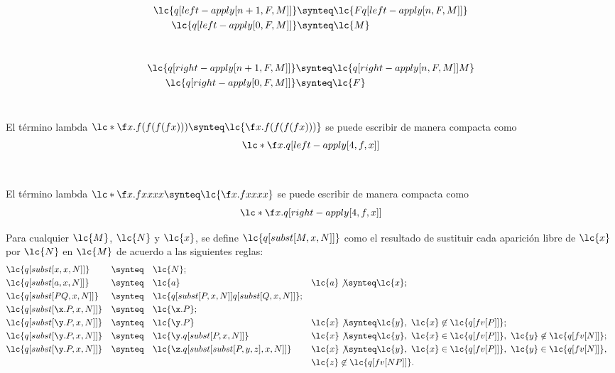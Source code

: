 \begin{align*}
  \lc{q[left-apply[n+1,F,M]]} &\synteq \lc{F q[left-apply[n,F,M]]}\\
  \lc{q[left-apply[0,F,M]]}   &\synteq \lc{M}
\end{align*} \

\begin{align*}
  \lc{q[right-apply[n+1,F,M]]} &\synteq \lc{q[right-apply[n,F,M]] M}\\
  \lc{q[right-apply[0,F,M]]}   &\synteq \lc{F}
\end{align*} \

\begin{ejemplo} El término lambda \(\lc*{\f x.f(f(f(f x)))} \synteq \lc{\f
    x.f(f(f(f x)))}\) se puede escribir de manera compacta como
  \[\lc*{\f x.q[left-apply[4,f,x]]}\]
\end{ejemplo} \

\begin{ejemplo} El término lambda \(\lc*{\f x.f x x x x} \synteq \lc{\f x.f x x
    x x}\) se puede escribir de manera compacta como
  \[\lc*{\f x.q[right-apply[4,f,x]]}\]
\end{ejemplo}

\begin{defi}[Sustitución] Para cualquier \(\lc{M}\), \(\lc{N}\) y \(\lc{x}\), se define \(\lc{q[subst[M,x,N]]}\) como el resultado de sustituir cada aparición libre de \(\lc{x}\) por \(\lc{N}\) en \(\lc{M}\) de acuerdo a las siguientes reglas:
  \label{definicion:sustitucion}
  \begin{align*}
    &\lc{q[subst[x,x,N]]} & &\synteq & &\lc{N}; \\
    &\lc{q[subst[a,x,N]]} & &\synteq & &\lc{a} & &\lc{a} \not\synteq \lc{x}; \\
    &\lc{q[subst[P Q,x,N]]} & &\synteq & &\lc{q[subst[P,x,N]] q[subst[Q,x,N]]}; \\
    &\lc{q[subst[\x.P,x,N]]} & &\synteq & &\lc{\x.P}; \\
    &\lc{q[subst[\y.P,x,N]]} & &\synteq & &\lc{\y.P} & &\lc{x}\not\synteq \lc{y},\ \lc{x} \not\in \lc{q[fv[P]]}; \\
    &\lc{q[subst[\y.P,x,N]]} & &\synteq & &\lc{\y.q[subst[P,x,N]]} & &\lc{x} \not\synteq \lc{y},\  \lc{x} \in \lc{q[fv[P]]},\  \lc{y} \not\in \lc{q[fv[N]]}; \\
    &\lc{q[subst[\y.P,x,N]]} & &\synteq & &\lc{\z.q[subst[subst[P,y,z],x,N]]} & &\lc{x} \not\synteq \lc{y},\  \lc{x} \in \lc{q[fv[P]]},\  \lc{y} \in \lc{q[fv[N]]}, \\
    & & & & & & & \lc{z}\not\in \lc{q[fv[N P]]}.
  \end{align*} \
\end{defi}

